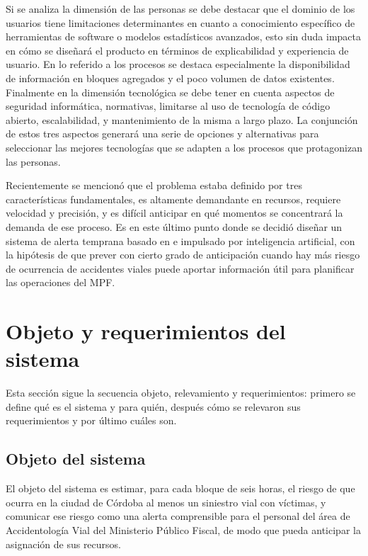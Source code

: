 Si se analiza la dimensión de las personas se debe destacar que el dominio de los usuarios tiene limitaciones determinantes en cuanto a conocimiento específico de herramientas de software o modelos estadísticos avanzados, esto sin duda impacta en cómo se diseñará el producto en términos de explicabilidad y experiencia de usuario. En lo referido a los procesos se destaca especialmente la disponibilidad de información en bloques agregados y el poco volumen de datos existentes. Finalmente en la dimensión tecnológica se debe tener en cuenta aspectos de seguridad informática, normativas, limitarse al uso de tecnología de código abierto, escalabilidad, y mantenimiento de la misma a largo plazo. La conjunción de estos tres aspectos generará una serie de opciones y alternativas para seleccionar las mejores tecnologías que se adapten a los procesos que protagonizan las personas.

Recientemente se mencionó que el problema estaba definido por tres características fundamentales, es altamente demandante en recursos, requiere velocidad y precisión, y es difícil anticipar en qué momentos se concentrará la demanda de ese proceso. Es en este último punto donde se decidió diseñar un sistema de alerta temprana basado en  e impulsado por inteligencia artificial, con la hipótesis de que prever con cierto grado de anticipación cuando hay más riesgo de ocurrencia de accidentes viales puede aportar información útil para planificar las operaciones del MPF.


\section{Objeto y requerimientos del sistema}\label{sec:objeto-requerimientos}

Esta sección sigue la secuencia objeto, relevamiento y requerimientos: primero se define qué es el sistema y para quién, después cómo se relevaron sus requerimientos y por último cuáles son.

\subsection{Objeto del sistema}\label{ssec:objeto}

El objeto del sistema es estimar, para cada bloque de seis horas, el riesgo de que ocurra en la ciudad de Córdoba al menos un siniestro vial con víctimas, y comunicar ese riesgo como una alerta comprensible para el personal del área de Accidentología Vial del Ministerio Público Fiscal, de modo que pueda anticipar la asignación de sus recursos.

